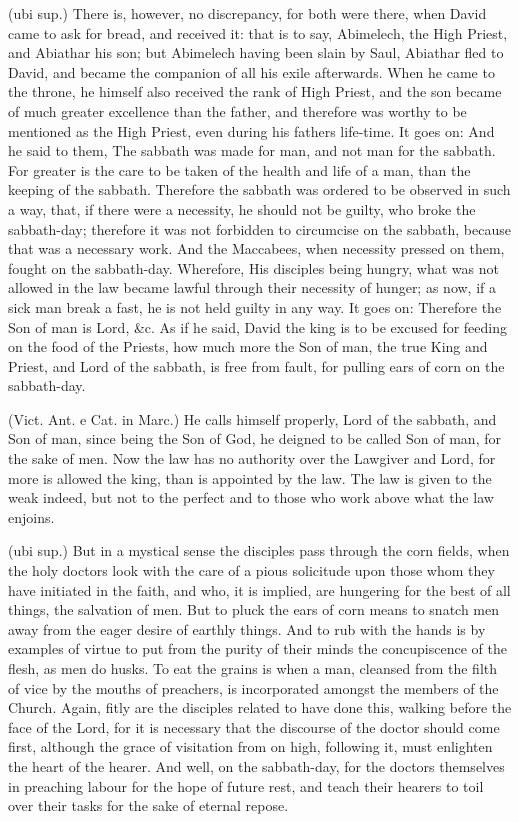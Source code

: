  (ubi sup.) There is, however, no discrepancy, for both were there, when David came to ask for bread, and received it: that is to say, Abimelech, the High Priest, and Abiathar his son; but Abimelech having been slain by Saul, Abiathar fled to David, and became the companion of all his exile afterwards. When he came to the throne, he himself also received the rank of High Priest, and the son became of much greater excellence than the father, and therefore was worthy to be mentioned as the High Priest, even during his fathers life-time. It goes on: And he said to them, The sabbath was made for man, and not man for the sabbath. For greater is the care to be taken of the health and life of a man, than the keeping of the sabbath. Therefore the sabbath was ordered to be observed in such a way, that, if there were a necessity, he should not be guilty, who broke the sabbath-day; therefore it was not forbidden to circumcise on the sabbath, because that was a necessary work. And the Maccabees, when necessity pressed on them, fought on the sabbath-day. Wherefore, His disciples being hungry, what was not allowed in the law became lawful through their necessity of hunger; as now, if a sick man break a fast, he is not held guilty in any way. It goes on: Therefore the Son of man is Lord, \&c. As if he said, David the king is to be excused for feeding on the food of the Priests, how much more the Son of man, the true King and Priest, and Lord of the sabbath, is free from fault, for pulling ears of corn on the sabbath-day.

 (Vict. Ant. e Cat. in Marc.) He calls himself properly, Lord of the sabbath, and Son of man, since being the Son of God, he deigned to be called Son of man, for the sake of men. Now the law has no authority over the Lawgiver and Lord, for more is allowed the king, than is appointed by the law. The law is given to the weak indeed, but not to the perfect and to those who work above what the law enjoins.

 (ubi sup.) But in a mystical sense the disciples pass through the corn fields, when the holy doctors look with the care of a pious solicitude upon those whom they have initiated in the faith, and who, it is implied, are hungering for the best of all things, the salvation of men. But to pluck the ears of corn means to snatch men away from the eager desire of earthly things. And to rub with the hands is by examples of virtue to put from the purity of their minds the concupiscence of the flesh, as men do husks. To eat the grains is when a man, cleansed from the filth of vice by the mouths of preachers, is incorporated amongst the members of the Church. Again, fitly are the disciples related to have done this, walking before the face of the Lord, for it is necessary that the discourse of the doctor should come first, although the grace of visitation from on high, following it, must enlighten the heart of the hearer. And well, on the sabbath-day, for the doctors themselves in preaching labour for the hope of future rest, and teach their hearers to toil over their tasks for the sake of eternal repose.

